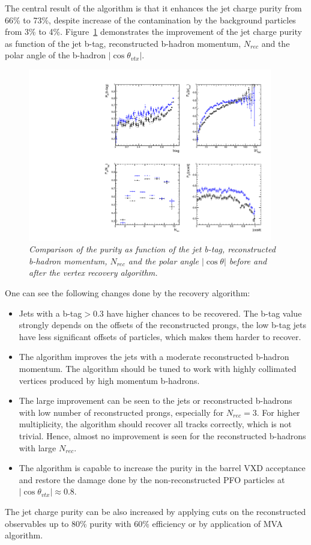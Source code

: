 The central result of the algorithm is that it enhances the jet charge purity from 66\% to 73\%, despite increase of the contamination by the  background particles from 3\% to 4\%.
Figure~\ref{fig:RecoveryPurityComparison_3} demonstrates the improvement of the jet charge purity as function of the jet b-tag, reconstructed b-hadron momentum, $N_{rec}$ and the polar angle of the b-hadron  $|\cos\theta_{vtx}|$.
\begin{figure}[h]
{\centering
    \includegraphics[width=0.95\textwidth]{ILD/plots/recovery-purity-comparison.pdf}
    \caption{\sl Comparison of the purity as function of the jet b-tag, reconstructed b-hadron momentum, $N_{rec}$ and the polar angle $|\cos\theta|$ before and after the vertex recovery algorithm.  
    }
    \label{fig:RecoveryPurityComparison_3}
  }
\end{figure}
One can see the following changes done by the recovery algorithm:
\begin{itemize}
\item Jets with a b-tag$>0.3$ have higher chances to be recovered. The b-tag value strongly depends on the offsets of the reconstructed prongs, the low b-tag jets have less significant offsets of particles, which makes them  harder to recover. 
\item The algorithm improves the jets with a moderate reconstructed b-hadron momentum. The algorithm should be tuned to work with highly collimated vertices produced by high momentum b-hadrons.
\item The large improvement can be seen to the jets or reconstructed b-hadrons with low number of reconstructed prongs, especially for $N_{rec}=3$. For higher multiplicity, the algorithm should recover all tracks correctly, which is not trivial. Hence, almost no improvement is seen for the reconstructed b-hadrons with large $N_{rec}$.
\item The algorithm is capable to increase the purity in the barrel VXD acceptance and restore the damage done by the non-reconstructed PFO particles at $|\cos\theta_{vtx}| \approx 0.8$. 
\end{itemize}
The jet charge purity can be also increased by applying cuts on the reconstructed observables up to 80\% purity with 60\% efficiency or by application of MVA algorithm.

